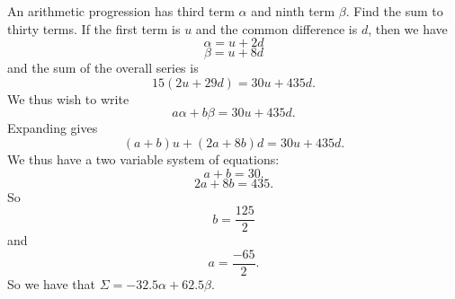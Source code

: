 An arithmetic progression has third term $\alpha$ and ninth term $\beta$. Find the sum to thirty terms. 
\newline
If the first term is $u$ and the common difference is $d$, then we have
\[
\alpha = u + 2d
\]
\[
\beta = u + 8d
\]
and the sum of the overall series is 
\[
15(2u + 29d) = 30u + 435d.
\]
We thus wish to write 
\[
a\alpha + b\beta = 30u + 435d.
\]
Expanding gives
\[
(a+b)u + (2a + 8b)d = 30 u + 435d. 
\]
We thus have a two variable system of equations:
\[
a+b = 30.
\]
\[
2a + 8b = 435.
\]
So
\[
b = \frac{125}{2}
\]
and
\[
a = \frac{-65}{2}.
\]
So we have that $\Sigma = -32.5 \alpha + 62.5 \beta$. 